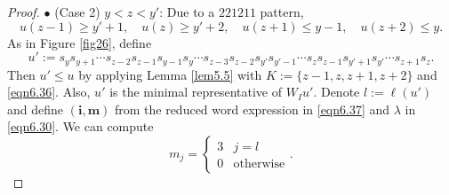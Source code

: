 \documentclass[12pt]{amsart}
\theoremstyle{definition}
\theoremstyle{remark}
\begin{document}
\begin{proof}
$\bullet$ (Case 2) $y< z < y'$: Due to a $221211$ pattern,
\begin{equation}\label{eqn6.36}
u(z-1) \geq y'+1 , \quad u(z) \geq y'+2 , \quad u(z+1) \leq y-1, \quad u(z+2) \leq y.
\end{equation}
As in Figure \ref{fig26}, define
\begin{equation}\label{eqn6.37}
u':= s_y s_{y+1} \cdots s_{z-2} s_{z-1} s_{y-1} s_y \cdots s_{z-3} s_{z-2} s_{y'} s_{y'-1} \cdots s_{z} s_{z-1} s_{y'+1} s_{y'} \cdots s_{z+1} s_z.
\end{equation}
Then $u' \leq u$ by applying Lemma \ref{lem5.5} with $K:=\{ z-1 , z , z+1 , z+2 \}$ and \eqref{eqn6.36}. Also, $u'$ is the minimal representative of $W_Iu'$. Denote $l:= \ell (u')$ and define $(\mathbf{i}, \mathbf{m})$ from the reduced word expression in \eqref{eqn6.37} and $\lambda$ in \eqref{eqn6.30}. We can compute
\begin{equation}\label{eqn6.38}
m_j = 
\begin{cases}
3 & j = l \\
0 & \text{otherwise}
\end{cases}
.
\end{equation}


\end{proof}
\end{document}
